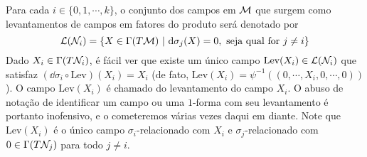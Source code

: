 \begin{oobs}
Para cada $i \in \{0, 1, \cdots, k\}$, o conjunto dos campos em $\mathcal{M}$ que surgem como levantamentos de campos em fatores do produto será denotado por
\[
\mathcal{L}(\mathcal{N}_i) = \{ X \in \Gamma(T \mathcal{M}) \ \vert \ \mathrm{d} \sigma_j (X) = 0, \text{ seja qual for $j\neq i$} \}
\]
Dado $X_i \in \Gamma(T \mathcal{N}_i)$, é fácil ver que existe um único campo $\text{Lev}(X_i) \in \mathcal{L}(\mathcal{N}_i) $ que satisfaz $\left( \dd \sigma_i \circ \text{Lev} \right)(X_i) = X_i$ (de fato, $\text{Lev}(X_i) = \psi^{-1}\left((0, \cdots, X_i, 0, \cdots, 0) \right)$). O campo $\text{Lev}(X_i)$ é chamado do levantamento do campo $X_i$. O abuso de notação de identificar um campo ou uma $1$-forma com seu levantamento é portanto inofensivo, e o cometeremos várias vezes daqui em diante. Note que $\text{Lev}(X_i)$ é o único campo $\sigma_i$-relacionado com $X_i$ e $\sigma_j$-relacionado com $0 \in \Gamma(T \mathcal{N}_j)$ para todo $j \neq i$. 
\end{oobs}


